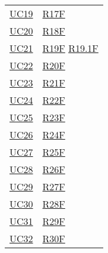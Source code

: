 \begin{center}
\begin{longtable}[!h]{m{50px} m{50px}}
        \hyperref[sec:UC19]{UC19}         & \hyperref[tab:RequisitiFunzionali]{R17F}    \\

        \hyperref[sec:UC20]{UC20}         & \hyperref[tab:RequisitiFunzionali]{R18F}    \\

        \hyperref[sec:UC21]{UC21}         & \hyperref[tab:RequisitiFunzionali]{R19F}
        \newline \hyperref[tab:RequisitiFunzionali]{R19.1F}                             \\


        \hyperref[sec:UC22]{UC22}         & \hyperref[tab:RequisitiFunzionali]{R20F}    \\

        \hyperref[sec:UC23]{UC23}         & \hyperref[tab:RequisitiFunzionali]{R21F}    \\

        \hyperref[sec:UC24]{UC24}         & \hyperref[tab:RequisitiFunzionali]{R22F}    \\

        \hyperref[sec:UC25]{UC25}         & \hyperref[tab:RequisitiFunzionali]{R23F}    \\

        \hyperref[sec:UC26]{UC26}         & \hyperref[tab:RequisitiFunzionali]{R24F}    \\

        \hyperref[sec:UC27]{UC27}         & \hyperref[tab:RequisitiFunzionali]{R25F}    \\

        \hyperref[sec:UC28]{UC28}         & \hyperref[tab:RequisitiFunzionali]{R26F}    \\

        \hyperref[sec:UC29]{UC29}         & \hyperref[tab:RequisitiFunzionali]{R27F}    \\

        \hyperref[sec:UC30]{UC30}         & \hyperref[tab:RequisitiFunzionali]{R28F}    \\

        \hyperref[sec:UC31]{UC31}         & \hyperref[tab:RequisitiFunzionali]{R29F}    \\

        \hyperref[sec:UC32]{UC32}         & \hyperref[tab:RequisitiFunzionali]{R30F}    \\


\end{longtable}
\end{center}
